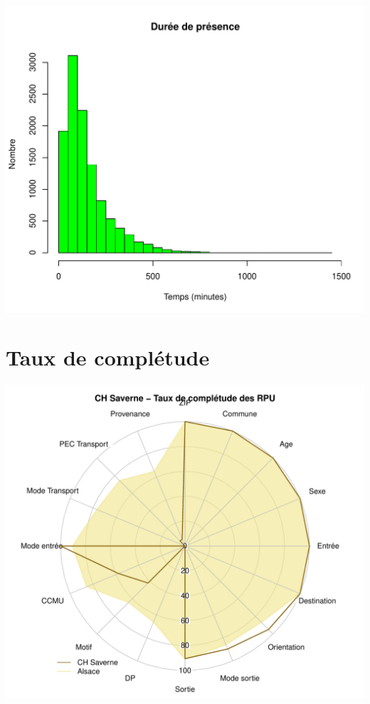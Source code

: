 \documentclass[12pt,english,french,twoside]{book}\usepackage[]{graphicx}\usepackage[]{color}
\makeatletter
\def\maxwidth{ %
  \ifdim\Gin@nat@width>\linewidth
    \linewidth
  \else
    \Gin@nat@width
  \fi
}
\newenvironment{knitrout}{}{} %
\makeatother
\begin{document}
\begin{knitrout}
\color{fgcolor}
\includegraphics[width=\maxwidth]{figure/graphe_sav} 

\end{knitrout}


\section*{Taux de complétude}

\begin{knitrout}
\color{fgcolor}
\includegraphics[width=\maxwidth]{figure/compl_sav} 

\end{knitrout}
\end{document}
